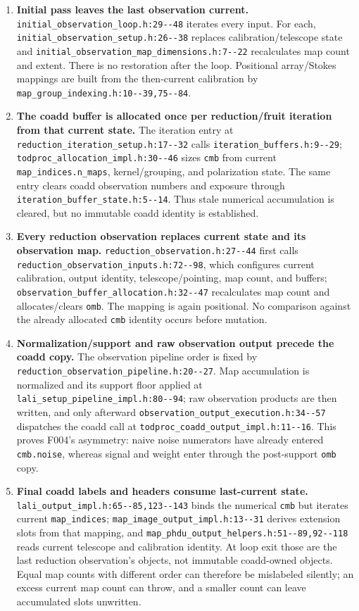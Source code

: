 \documentclass[11pt]{article}
\newcommand{\code}[1]{\nolinkurl{#1}}
\begin{document}
\begin{enumerate}[leftmargin=*,label=\arabic*.]
\raggedright
\item \textbf{Initial pass leaves the last observation current.}
\code{initial_observation_loop.h:29--48} iterates every input.  For each,
\code{initial_observation_setup.h:26--38} replaces calibration/telescope state
and \code{initial_observation_map_dimensions.h:7--22} recalculates map count and
extent.  There is no restoration after the loop.  Positional array/Stokes
mappings are built from the then-current calibration by
\code{map_group_indexing.h:10--39,75--84}.

\item \textbf{The coadd buffer is allocated once per reduction/fruit
iteration from that current state.}  The iteration entry at
\code{reduction_iteration_setup.h:17--32} calls
\code{iteration_buffers.h:9--29}; \code{todproc_allocation_impl.h:30--46}
sizes \code{cmb} from current \code{map_indices.n_maps}, kernel/grouping, and
polarization state.  The same entry clears coadd observation numbers and
exposure through \code{iteration_buffer_state.h:5--14}.  Thus stale numerical
accumulation is cleared, but no immutable coadd identity is established.

\item \textbf{Every reduction observation replaces current state and its
observation map.}  \code{reduction_observation.h:27--44} first calls
\code{reduction_observation_inputs.h:72--98}, which configures current
calibration, output identity, telescope/pointing, map count, and buffers;
\code{observation_buffer_allocation.h:32--47} recalculates map count and
allocates/clears \code{omb}.  The mapping is again positional.  No comparison
against the already allocated \code{cmb} identity occurs before mutation.

\item \textbf{Normalization/support and raw observation output precede the
coadd copy.}  The observation pipeline order is fixed by
\code{reduction_observation_pipeline.h:20--27}.  Map accumulation is normalized
and its support floor applied at \code{lali_setup_pipeline_impl.h:80--94}; raw
observation products are then written, and only afterward
\code{observation_output_execution.h:34--57} dispatches the coadd call at
\code{todproc_coadd_output_impl.h:11--16}.  This proves F004's asymmetry: naive
noise numerators have already entered \code{cmb.noise}, whereas signal and
weight enter through the post-support \code{omb} copy.

\item \textbf{Final coadd labels and headers consume last-current state.}
\code{lali_output_impl.h:65--85,123--143} binds the numerical \code{cmb} but
iterates current \code{map_indices}; \code{map_image_output_impl.h:13--31}
derives extension slots from that mapping, and
\code{map_phdu_output_helpers.h:51--89,92--118} reads current telescope and
calibration identity.  At loop exit those are the last reduction observation's
objects, not immutable coadd-owned objects.  Equal map counts with different
order can therefore be mislabeled silently; an excess current map count can
throw, and a smaller count can leave accumulated slots unwritten.


\end{enumerate}
\end{document}
